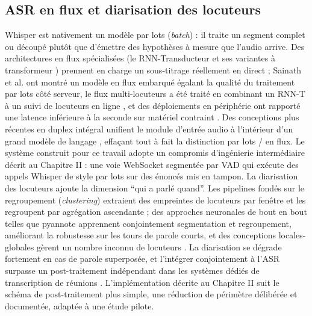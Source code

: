 \documentclass[12pt]{report}
\begin{document}
\subsection{ASR en flux et diarisation des locuteurs}
Whisper est nativement un modèle par lots (\textit{batch}) : il traite un segment complet ou découpé plutôt que d'émettre des hypothèses à mesure que l'audio arrive. Des architectures en flux spécialisées (le RNN-Transducteur et ses variantes à transformeur \cite{moritz2020streaming,tsunoo2021streaming,chen2021developing}) prennent en charge un sous-titrage réellement en direct ; Sainath et al. \cite{sainath2020streaming} ont montré un modèle en flux embarqué égalant la qualité du traitement par lots côté serveur, le flux multi-locuteurs a été traité en combinant un RNN-T à un suivi de locuteurs en ligne \cite{sklyar2021streaming}, et des déploiements en périphérie ont rapporté une latence inférieure à la seconde sur matériel contraint \cite{dileo2025realtime}. Des conceptions plus récentes en duplex intégral unifient le module d'entrée audio à l'intérieur d'un grand modèle de langage \cite{li2026uaf}, effaçant tout à fait la distinction par lots / en flux. Le système construit pour ce travail adopte un compromis d'ingénierie intermédiaire décrit au Chapitre II : une voie WebSocket segmentée par VAD qui exécute des appels Whisper de style par lots sur des énoncés mis en tampon.
La diarisation des locuteurs ajoute la dimension \enquote{qui a parlé quand}. Les pipelines fondés sur le regroupement (\textit{clustering}) extraient des empreintes de locuteurs par fenêtre et les regroupent par agrégation ascendante ; des approches neuronales de bout en bout telles que pyannote \cite{bredin2020pyannote} apprennent conjointement segmentation et regroupement, améliorant la robustesse sur les tours de parole courts, et des conceptions locales-globales gèrent un nombre inconnu de locuteurs \cite{maiti2021endtoend}. La diarisation se dégrade fortement en cas de parole superposée, et l'intégrer conjointement à l'ASR surpasse un post-traitement indépendant dans les systèmes dédiés de transcription de réunions \cite{raj2021integration,yoshioka2019advances,wang2021exploring}. L'implémentation décrite au Chapitre II suit le schéma de post-traitement plus simple, une réduction de périmètre délibérée et documentée, adaptée à une étude pilote.
\end{document}
